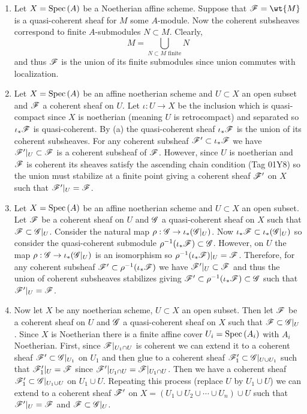 \documentclass[12pt]{article}
\begin{document}
\begin{enumerate}
\item Let $X = \mathrm{Spec}\left( A \right)$ be a Noetherian affine scheme. Suppose that $\F = \wt{M}$ is a quasi-coherent sheaf for $M$ some $A$-module. Now the coherent subsheaves correspond to finite $A$-submodules $N \subset M$. Clearly,
\[ M = \bigcup_{N \subset M \text{ finite}} N \]
and thus $\mathscr{F}$ is the union of its finite submodules since union commutes with localization.

\item Let $X = \mathrm{Spec}\left( A \right)$ be an affine noetherian scheme and $U \subset X$ an open subset and $\mathscr{F}$ a coherent sheaf on $U$. Let $\iota : U \to X$ be the inclusion which is quasi-compact since $X$ is noetherian (meaning $U$ is retrocompact) and separated so $\iota_* \mathscr{F}$ is quasi-coherent. By (a) the quasi-coherent sheaf $\iota_* \mathscr{F}$ is the union of its coherent subsheaves. For any coherent subsheaf $\mathscr{F}' \subset \iota_* \mathscr{F}$ we have $\mathscr{F}'|_U \subset \mathscr{F}$ is a coherent subsheaf of $\mathscr{F}$. However, since $U$ is noetherian and $\mathscr{F}$ is coherent its sheaves satisfy the ascending chain condition (Tag 01Y8) so the union must stabilize at a finite point giving a coherent sheaf $\mathscr{F}'$ on $X$ such that $\mathscr{F}'|_U = \mathscr{F}$.

\item Let $X = \mathrm{Spec}\left( A \right)$ be an affine noetherian scheme and $U \subset X$ an open subset. Let $\mathscr{F}$ be a coherent sheaf on $U$ and $\mathscr{G}$ a quasi-coherent sheaf on $X$ such that $\mathscr{F} \subset \mathscr{G}|_U$. Consider the natural map $\rho : \mathscr{G} \to \iota_* (\mathscr{G}|_U)$. Now $\iota_* \mathscr{F} \subset \iota_* (\mathscr{G}|_U)$ so consider the quasi-coherent submodule $\rho^{-1}(\iota_* \mathscr{F}) \subset \mathscr{G}$. However, on $U$ the map $\rho : \mathscr{G} \to \iota_* (\mathscr{G}|_U)$ is an isomorphism so $\rho^{-1}(\iota_* \mathscr{F}) |_U = \mathscr{F}$. Therefore, for any coherent subsheaf $\mathscr{F}' \subset \rho^{-1}(\iota_* \mathscr{F})$ we have $\mathscr{F}'|_U \subset \mathscr{F}$ and thus the union of coherent subsheaves stabilizes giving $\mathscr{F}' \subset \rho^{-1}(\iota_* \mathscr{F})  \subset \mathscr{G}$ such that $\mathscr{F}'|_U = \mathscr{F}$.

\item Now let $X$ be any noetherian scheme, $U \subset X$ an open subset. Then let $\mathscr{F}$ be a coherent sheaf on $U$ and $\mathscr{G}$ a quasi-coherent sheaf on $X$ such that $\mathscr{F} \subset \mathscr{G}|_U$. Since $X$ is Noetherian there is a finite affine cover $U_i = \mathrm{Spec}\left( A_i \right)$ with $A_i$ Noetherian.
First, since $\mathscr{F}|_{U_1 \cap U}$ is coherent we can extend it to a coherent sheaf $\mathscr{F}' \subset \mathscr{G}|_{U_1}$ on $U_1$ and then glue to a coherent sheaf $\mathscr{F}'_1 \subset \mathscr{G}|_{U \cup U_1}$ such that $\mathscr{F}'_1 |_U = \mathscr{F}$ since $\mathscr{F}'|_{U_1 \cap U} = \mathscr{F}|_{U_1 \cap U}$. Then we have a coherent sheaf $\mathscr{F}'_1 \subset \mathscr{G}|_{U_1 \cup U}$ on $U_1 \cup U$. Repeating this process (replace $U$ by $U_1 \cup U$) we can extend to a coherent sheaf $\mathscr{F}'$ on $X = (U_1 \cup U_2 \cup \cdots \cup U_n) \cup U$ such that $\mathscr{F}'|_U = \mathscr{F}$ and $\mathscr{F} \subset \mathscr{G}|_U$.


\end{enumerate}
\end{document}
